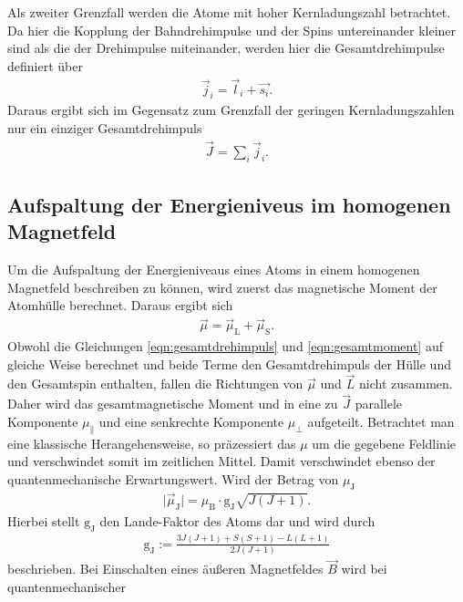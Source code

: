 Als zweiter Grenzfall werden die Atome mit hoher Kernladungszahl betrachtet.
Da hier die Kopplung der Bahndrehimpulse und der Spins untereinander kleiner sind
als die der Drehimpulse miteinander, werden hier die Gesamtdrehimpulse definiert
über
\begin{align}
  \vec{j}_i = \vec{l}_i + \vec{s_i}.
  \label{eqn:gesamt}
\end{align}
Daraus ergibt sich im Gegensatz zum Grenzfall der geringen Kernladungszahlen nur
ein einziger Gesamtdrehimpuls
\begin{align}
  \vec{J} = \sum_i \vec{j}_i.
  \label{eqn:gesamtdrehimpuls}
\end{align}

\subsection{Aufspaltung der Energieniveus im homogenen Magnetfeld}
\label{sec:aufspaltung}
Um die Aufspaltung der Energieniveaus eines Atoms in einem homogenen Magnetfeld
beschreiben zu können, wird zuerst das magnetische Moment der Atomhülle berechnet.
Daraus ergibt sich
\begin{align}
  \vec{\mu} = \vec{\mu}_\text{L} + \vec{\mu}_\text{S}.
  \label{eqn:gesamtmoment}
\end{align}
Obwohl die Gleichungen \ref{eqn:gesamtdrehimpuls} und \ref{eqn:gesamtmoment}
auf gleiche Weise berechnet und beide Terme den Gesamtdrehimpuls der Hülle und
den Gesamtspin enthalten, fallen die Richtungen von $\vec{\mu}$ und $\vec{L}$
nicht zusammen. Daher wird das gesamtmagnetische Moment und in eine zu $\vec{J}$
parallele Komponente $\mu_{\parallel}$ und eine senkrechte Komponente $\mu_{\bot}$
aufgeteilt. Betrachtet man eine klassische Herangehensweise, so präzessiert das
$\mu$ um die gegebene Feldlinie und verschwindet somit im zeitlichen Mittel. Damit
verschwindet ebenso der quantenmechanische Erwartungswert. Wird der Betrag von
$\mu_\text{J}$
\begin{align}
  \mid \vec{\mu}_\text{J} \mid = \mu_\text{B}\cdot \text{g}_\text{J} \sqrt{J\left(J+1 \right)}.
\end{align}
Hierbei stellt $\text{g}_\text{J}$ den Lande-Faktor des Atoms dar und wird durch
\begin{align}
  \text{g}_\text{J} := \frac{3J\left(J+1 \right) + S\left(S+1 \right) - L\left(L+1 \right)}{2J\left(J+1 \right)}
\end{align}
beschrieben.
Bei Einschalten eines äußeren Magnetfeldes $\vec{B}$ wird bei quantenmechanischer
